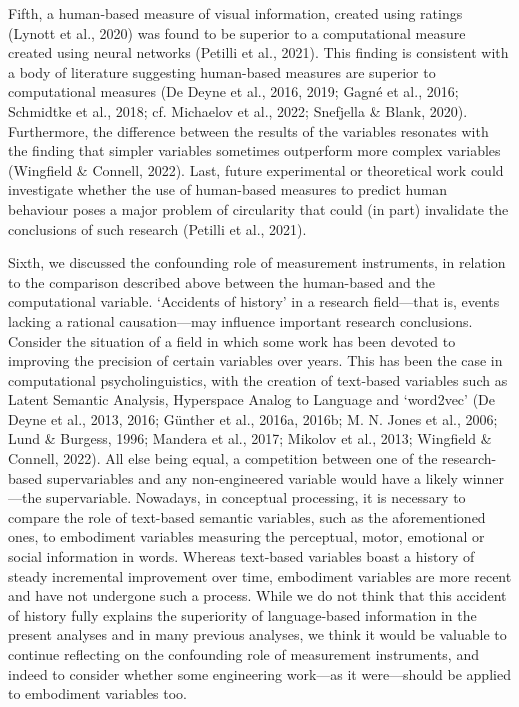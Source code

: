 \documentclass[
  12pt,
  man,floatsintext]{apa7}
\begin{document}
Fifth, a human-based measure of visual information, created using ratings (Lynott et al., 2020) was found to be superior to a computational measure created using neural networks (Petilli et al., 2021). This finding is consistent with a body of literature suggesting human-based measures are superior to computational measures (De Deyne et al., 2016, 2019; Gagné et al., 2016; Schmidtke et al., 2018; cf. Michaelov et al., 2022; Snefjella \& Blank, 2020). Furthermore, the difference between the results of the variables resonates with the finding that simpler variables sometimes outperform more complex variables (Wingfield \& Connell, 2022). Last, future experimental or theoretical work could investigate whether the use of human-based measures to predict human behaviour poses a major problem of circularity that could (in part) invalidate the conclusions of such research (Petilli et al., 2021).

Sixth, we discussed the confounding role of measurement instruments, in relation to the comparison described above between the human-based and the computational variable. `Accidents of history' in a research field---that is, events lacking a rational causation---may influence important research conclusions. Consider the situation of a field in which some work has been devoted to improving the precision of certain variables over years. This has been the case in computational psycholinguistics, with the creation of text-based variables such as Latent Semantic Analysis, Hyperspace Analog to Language and `word2vec' (De Deyne et al., 2013, 2016; Günther et al., 2016a, 2016b; M. N. Jones et al., 2006; Lund \& Burgess, 1996; Mandera et al., 2017; Mikolov et al., 2013; Wingfield \& Connell, 2022). All else being equal, a competition between one of the research-based supervariables and any non-engineered variable would have a likely winner---the supervariable. Nowadays, in conceptual processing, it is necessary to compare the role of text-based semantic variables, such as the aforementioned ones, to embodiment variables measuring the perceptual, motor, emotional or social information in words. Whereas text-based variables boast a history of steady incremental improvement over time, embodiment variables are more recent and have not undergone such a process. While we do not think that this accident of history fully explains the superiority of language-based information in the present analyses and in many previous analyses, we think it would be valuable to continue reflecting on the confounding role of measurement instruments, and indeed to consider whether some engineering work---as it were---should be applied to embodiment variables too.
\end{document}
